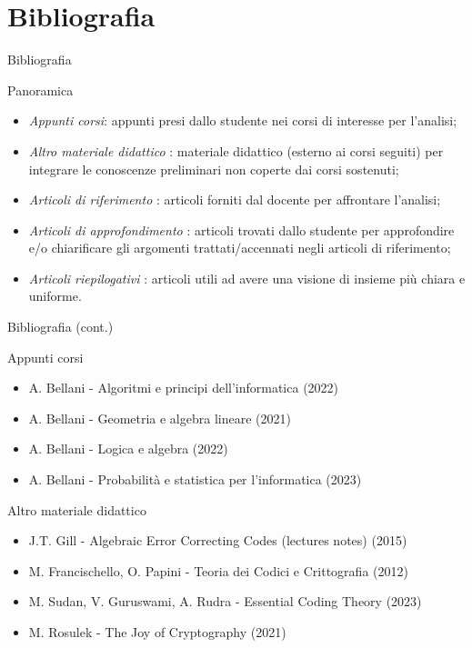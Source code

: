 \documentclass[10pt]{beamer}
\begin{document}
	\section{Bibliografia}
		\begin{frame}{Bibliografia}
			\begin{block}{Panoramica}
				\begin{itemize}
					\item \emph{Appunti corsi}: appunti presi dallo studente nei corsi di interesse per l'analisi;
					\item \emph{Altro materiale didattico} : materiale didattico (esterno ai corsi seguiti) per integrare le conoscenze preliminari non coperte dai corsi sostenuti;
					\item \emph{Articoli di riferimento} : articoli forniti dal docente per affrontare l'analisi;
					\item \emph{Articoli di approfondimento} : articoli trovati dallo studente per approfondire e/o chiarificare gli argomenti trattati/accennati negli articoli di riferimento;
					\item \emph{Articoli riepilogativi} : articoli utili ad avere una visione di insieme più chiara e uniforme.
				\end{itemize}
			\end{block}
		\end{frame}
		\begin{frame}{Bibliografia (cont.)}
			\begin{block}{Appunti corsi}
				\begin{itemize}
					\item A. Bellani - Algoritmi e principi dell'informatica (2022)
					\item A. Bellani - Geometria e algebra lineare (2021)
					\item A. Bellani - Logica e algebra (2022)
					\item A. Bellani - Probabilità e statistica per l'informatica (2023)
				\end{itemize}
			\end{block}
			\begin{block}{Altro materiale didattico}
				\begin{itemize}
					\item J.T. Gill - Algebraic Error Correcting Codes (lectures notes) (2015)
					\item M. Francischello, O. Papini - Teoria dei Codici e Crittografia (2012)
					\item M. Sudan, V. Guruswami, A. Rudra - Essential Coding Theory (2023)
					\item M. Rosulek - The Joy of Cryptography (2021)
				\end{itemize}
			\end{block}
		\end{frame}
\end{document}

